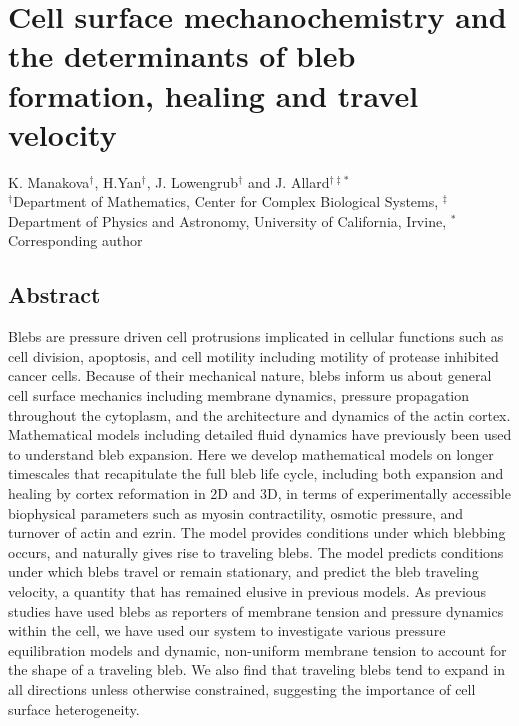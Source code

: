 \chapter{Cell surface mechanochemistry and the determinants of bleb formation, healing and travel velocity}
K. Manakova$^\dag$, H.Yan$^\dag$, J. Lowengrub$^\dag$ and J. Allard$^{\dag\ddag\ast}$\\
$^\dag$Department of Mathematics, Center for Complex Biological Systems, $^\ddag$Department of Physics and Astronomy, University of California, Irvine, $^\ast$Corresponding author \\ 

\section*{Abstract}

Blebs are pressure driven cell protrusions implicated in cellular functions such as cell division, apoptosis, and cell motility including motility of protease inhibited cancer cells. Because of their mechanical nature, blebs inform us about general cell surface mechanics including membrane dynamics, pressure propagation throughout the cytoplasm, and the architecture and dynamics of the actin cortex. Mathematical models including detailed fluid dynamics have previously been used to understand bleb expansion. Here we develop mathematical models on longer timescales that recapitulate the full bleb life cycle, including both expansion and healing by cortex reformation in 2D and 3D, in terms of experimentally accessible biophysical parameters such as myosin contractility, osmotic pressure, and turnover of actin and ezrin. The model provides conditions under which blebbing occurs, and naturally gives rise to traveling blebs. The model predicts conditions under which blebs travel or remain stationary, and predict the bleb traveling velocity, a quantity that has remained elusive in previous models.  As previous studies have used blebs as reporters of membrane tension and pressure dynamics within the cell, we have used our system to investigate various pressure equilibration models and dynamic, non-uniform membrane tension to account for the shape of a traveling bleb. We also find that traveling blebs tend to expand in all directions unless otherwise constrained, suggesting the importance of cell surface heterogeneity. 








